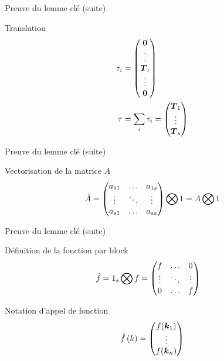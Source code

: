 \begin{frame}{Preuve du lemme clé (suite)}
\begin{block}{Translation}
 \begin{align*}
	\tau_i&=\begin{pmatrix}
			{\boldsymbol {0}}\\
			\vdots\\
			{\boldsymbol {T}}_{i}\\
			\vdots\\
			{\boldsymbol {0}}\\
	\end{pmatrix}
	\\
	\tau&=\sum_{i}\tau_{i}=\begin{pmatrix}
			{\boldsymbol {T}}_{1}\\
			\vdots\\
			{\boldsymbol {T}}_{s}\\
	\end{pmatrix}
\end{align*}
\end{block}
\end{frame}

\begin{frame}{Preuve du lemme clé (suite)}
  
 \begin{block}{Vectorisation de la matrice $A$}
  \begin{equation*}
\hat{A}=\begin{pmatrix}
    a_{11}	&\ldots	&a_{1s}\\
    \vdots	&\ddots	&\vdots\\
    a_{s1}	&\ldots	&a_{ss}\\
  \end{pmatrix} \bigotimes 1=A \bigotimes 1
\end{equation*}
 \end{block}

\end{frame}

\begin{frame}[<+->]{Preuve du lemme clé (suite)}
\begin{block}{Définition de la fonction par block}
 \begin{align*}
\hat{f}&=1_{s}\bigotimes f=\begin{pmatrix}f	&\ldots	&0\\
			\vdots &\ddots 	&\vdots\\
			0	&\ldots	&f\\
	\end{pmatrix}
\end{align*}
\end{block}
\begin{block}{Notation d'appel de fonction}
 \begin{equation*}
 \hat{f}\left(k\right)=\begin{pmatrix}f({\boldsymbol {k}}_1)\\
			\vdots\\
			f({\boldsymbol {k}}_n)\\
	\end{pmatrix}
\end{equation*}
\end{block}

\end{frame}

